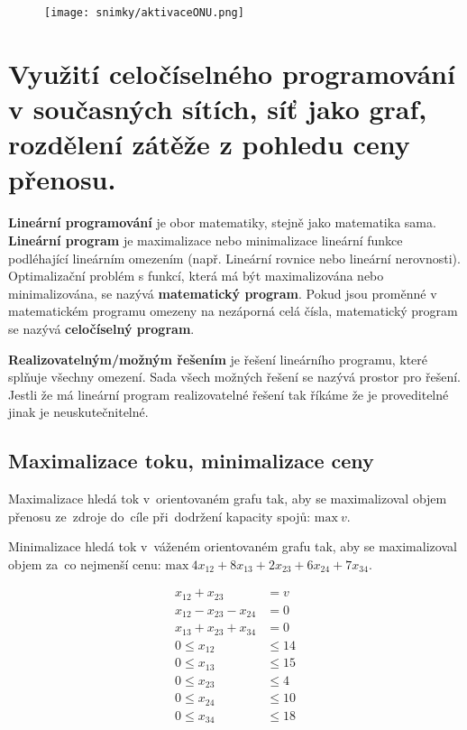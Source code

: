 \begin{figure} [h]
    \centering
    \texttt{[image: snimky/aktivaceONU.png]}
\end{figure}


\clearpage
\section{Využití celočíselného programování v současných sítích, síť jako graf, rozdělení zátěže z pohledu ceny přenosu.}
\textbf{Lineární programování} je obor matematiky, stejně jako matematika sama. \textbf{Lineární program} je maximalizace nebo minimalizace lineární funkce podléhající lineárním omezením (např. Lineární rovnice nebo lineární nerovnosti). Optimalizační problém s funkcí, která má být maximalizována nebo minimalizována, se nazývá \textbf{matematický program}. Pokud jsou proměnné v matematickém programu omezeny na nezáporná celá čísla, matematický program se nazývá \textbf{celočíselný program}.

\textbf{Realizovatelným/možným řešením} je řešení lineárního programu, které splňuje všechny omezení. Sada všech možných řešení se nazývá prostor pro řešení. Jestli že má lineární program realizovatelné řešení tak říkáme že je proveditelné jinak je neuskutečnitelné.

\subsection{Maximalizace toku, minimalizace ceny}

Maximalizace hledá tok v~orientovaném grafu tak, aby se maximalizoval objem přenosu ze~zdroje do~cíle při~dodržení kapacity spojů:
$\text{max}~v$.

Minimalizace hledá tok v~váženém orientovaném grafu tak, aby se maximalizoval objem za~co nejmenší cenu:
$\text{max}\ 4x_{12} + 8x_{13} + 2x_{23} + 6x_{24} + 7x_{34}$.

\begin{center}\begin{minipage}{0.3\textwidth}
        \begin{align}
            x_{12} + x_{23}          & = v     \\
            x_{12} - x_{23} - x_{24} & = 0     \\
            x_{13} + x_{23} + x_{34} & = 0     \\
            0 \leq x_{12}            & \leq 14 \\
            0 \leq x_{13}            & \leq 15 \\
            0 \leq x_{23}            & \leq 4  \\
            0 \leq x_{24}            & \leq 10 \\
            0 \leq x_{34}            & \leq 18
        \end{align}
    \end{minipage}\end{center}

